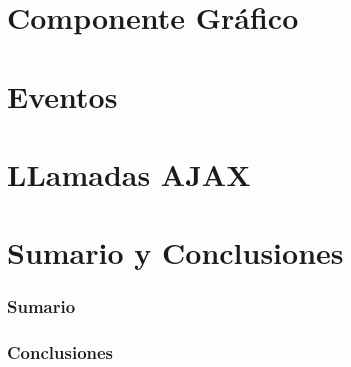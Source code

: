 \documentclass[a4paper,slidestop,xcolor=pst,blue]{beamer}
\begin{document}
\section{Componente Gráfico}

\section{Eventos}


\section{LLamadas AJAX}


\section{Sumario y Conclusiones}

\begin{frame}[c]
    \frametitle{Sumario}
\end{frame}

\begin{frame}[c]
    \frametitle{Conclusiones}
\end{frame}
\end{document}
